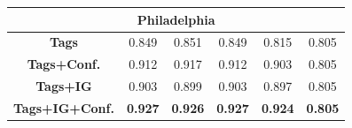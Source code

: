 \begin{table}[b!]
\begin{center}
{{\begin{tabular} {|@{\spc}c@{\spc}|@{\spc}c@{\spc}|@{\spc}c@{\spc}|@{\spc}c@{\spc}|@{\spc}c@{\spc}|@{\spc}c@{\spc}|}
\hline 

\multicolumn{6}{|c|}{\textbf{Philadelphia}}  \\ %
\hline
\textbf{Tags} & 0.849   &  0.851  &   0.849 &    0.815 &0.805  \\   %
\hline 
\textbf{Tags+Conf.} &0.912   &   0.917  &   0.912 &    0.903 &0.805 \\ %
\hline
\textbf{Tags+IG} & 0.903    &   0.899 &    0.903 &    0.897 &0.805  \\ %
\hline 
\textbf{Tags+IG+Conf.}& \textbf{0.927}    & \textbf{0.926} & \textbf{ 0.927} &  \textbf{0.924} &\textbf{0.805}    \\ %
\hline 
\end{tabular}}}
\end{center}
\end{table}




